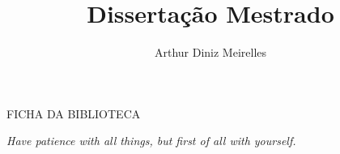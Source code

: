 \documentclass[openany,a4paper,12pt,oneside]{book}
\title{Dissertação Mestrado}
\author{Arthur Diniz Meirelles}
\date{}
\begin{document}



\newpage

\begin{center}
\thispagestyle{empty}
\vspace*{\fill}
FICHA DA BIBLIOTECA
\vspace*{\fill}
\end{center}

\newpage




\begin{center}
\thispagestyle{empty}
\vspace*{\fill}
\textit{Have patience with all things, but first of all with yourself.}
\vspace*{\fill}
\end{center}


\end{document}
